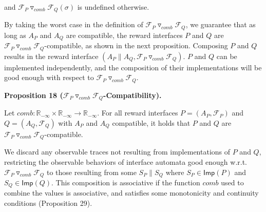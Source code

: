 and ${{\mathcal{F}_{P}}\mathbin{\triangledown_{\mathit{comb}}}{\mathcal{F}_{Q}}}(\sigma)$ is undefined otherwise.\par
 
 
 
 
By taking the worst case in the definition of ${{\mathcal{F}_{P}}\mathbin{\triangledown_{\mathit{comb}}}{\mathcal{F}_{Q}}}$, we guarantee that as long as $A_{P}$ and $A_{Q}$ are compatible, the reward interfaces $P$ and $Q$ are ${{\mathcal{F}_{P}}\mathbin{\triangledown_{\mathit{comb}}}{\mathcal{F}_{Q}}}$-compatible, as shown in the next proposition. Composing $P$ and $Q$ results in the reward interface $(A_{P}\parallel A_{Q},{{\mathcal{F}_{P}}\mathbin{\triangledown_{\mathit{comb}}}{\mathcal{F}_{Q}}})$. $P$ and $Q$ can be implemented independently, and the composition of their implementations will be good enough with respect to ${{\mathcal{F}_{P}}\mathbin{\triangledown_{\mathit{comb}}}{\mathcal{F}_{Q}}}$.\par
 
 
 
\par\medskip\noindent\textbf{Proposition 18 (${{\mathcal{F}_{P}}\mathbin{\triangledown_{\mathit{comb}}}{\mathcal{F}_{Q}}}$-Compatibility).}\par
 
 
Let $\mathit{comb}:\mathbb{R}_{-\infty}\times\mathbb{R}_{-\infty}\to\mathbb{R}_{-\infty}$. For all reward interfaces $P=(A_{P},\mathcal{F}_{P})$ and $Q=(A_{Q},\mathcal{F}_{Q})$ with $A_{P}$ and $A_{Q}$ compatible, it holds that $P$ and $Q$ are ${{\mathcal{F}_{P}}\mathbin{\triangledown_{\mathit{comb}}}{\mathcal{F}_{Q}}}$-compatible.\par
 
 
 
 
We discard any observable traces not resulting from implementations of $P$ and $Q$, restricting the observable behaviors of interface automata good enough w.r.t. ${{\mathcal{F}_{P}}\mathbin{\triangledown_{\mathit{comb}}}{\mathcal{F}_{Q}}}$ to those resulting from some $S_{P}\parallel S_{Q}$ where $S_{P}\in\mathsf{Imp}(P)$ and $S_{Q}\in\mathsf{Imp}(Q)$. This composition is associative if the function $\mathit{comb}$ used to combine the values is associative, and satisfies some monotonicity and continuity conditions (Proposition 29).\par
 
